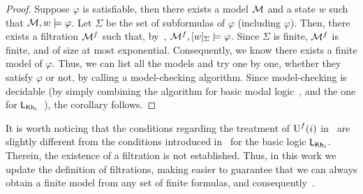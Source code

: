 \begin{proof}
Suppose $\varphi$ is satisfiable, then there exists a model $\mathcal{M}$ and a state $w$ such that $\mathcal{M},w\models\varphi$. Let $\Sigma$ be the set of subformulas of $\varphi$ (including $\varphi$).
Then, there exists a filtration $\mathcal{M}^f$ such that, by~, $\mathcal{M}^f,[w]_\Sigma\models\varphi$. Since $\Sigma$ is finite, $\mathcal{M}^f$ is finite, and of size at most exponential.
Consequently, we know there exists a finite model of $\varphi$. Thus, we can list all the models and try one by one, whether they satisfy $\varphi$ or not, by calling a model-checking algorithm.
Since model-checking is decidable (by simply combining the algorithm for basic modal logic~\cite{mlbook}, and the one for $\mathsf{L}_{{\sf Kh}_i}$~\cite{AFSVQ21,AFSVQ23report}), the corollary follows. 
\end{proof}

\medskip

It is worth noticing that the conditions regarding the treatment of $\operatorname{U}^f(i)$ in~ are slightly different from the conditions introduced in~\cite{AFSVQ23report} for the basic logic $\mathsf{L}_{{\sf Kh}_i}$. Therein, the existence of a filtration is not established. Thus, in this work we update the definition of filtrations, making easier to guarantee that we can always obtain a finite model from any set of finite formulas, and consequently~.

